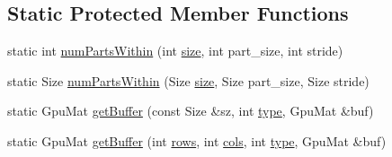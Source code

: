 \subsection*{Static Protected Member Functions}
\begin{DoxyCompactItemize}
\item 
static int \hyperlink{structcv_1_1gpu_1_1HOGDescriptor_a3d6587836c6abdda9ad172bfc47e471d}{num\-Parts\-Within} (int \hyperlink{legacy_8hpp_ae97003f8d5c64cdfb99f6f2606d121b6}{size}, int part\-\_\-size, int stride)
\item 
static Size \hyperlink{structcv_1_1gpu_1_1HOGDescriptor_a94cc2eb64e6c4a60b5e01e4d5f1a8329}{num\-Parts\-Within} (Size \hyperlink{legacy_8hpp_ae97003f8d5c64cdfb99f6f2606d121b6}{size}, Size part\-\_\-size, Size stride)
\item 
static Gpu\-Mat \hyperlink{structcv_1_1gpu_1_1HOGDescriptor_ae79786ec68824aa1886e919d9b0964c2}{get\-Buffer} (const Size \&sz, int \hyperlink{imgproc__c_8h_a84612d8738bf935200cf32a103d8efe1}{type}, Gpu\-Mat \&buf)
\item 
static Gpu\-Mat \hyperlink{structcv_1_1gpu_1_1HOGDescriptor_a3d9a7292007e5ddc64a540bce7b94c4e}{get\-Buffer} (int \hyperlink{imgproc__c_8h_a061459acc9e078fa4699e0e349887215}{rows}, int \hyperlink{core__c_8h_a4407a60bc4387adae24cee658711f2d9}{cols}, int \hyperlink{imgproc__c_8h_a84612d8738bf935200cf32a103d8efe1}{type}, Gpu\-Mat \&buf)
\end{DoxyCompactItemize}
